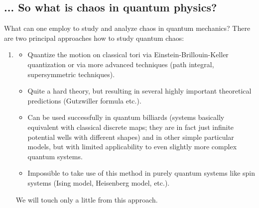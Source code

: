 \documentclass[a4paper,11pt,twoside]{article}
\begin{document}
    \subsection{... So what is chaos in quantum physics?}
        What can one employ to study and analyze chaos in quantum mechanics?
        There are two principal approaches how to study quantum chaos:
        \begin{enumerate}
            \item {}
                \begin{itemize}
                    \item Quantize the motion on classical tori via Einstein-Brillouin-Keller quantization or via more advanced techniques (path integral, supersymmetric techniques).
                    \item Quite a hard theory, but resulting in several highly important theoretical predictions (Gutzwiller formula etc.).
                    \item Can be used successfully in quantum billiards (systems basically equivalent with classical discrete maps; they are in fact just infinite potential wells with different shapes) and in other simple particular models, but with limited applicability to even slightly more complex quantum systems.
                    \item Impossible to take use of this method in purely quantum systems like spin systems (Ising model, Heisenberg model, etc.).
                \end{itemize}
                We will touch only a little from this approach.


\end{enumerate}
\end{document}
